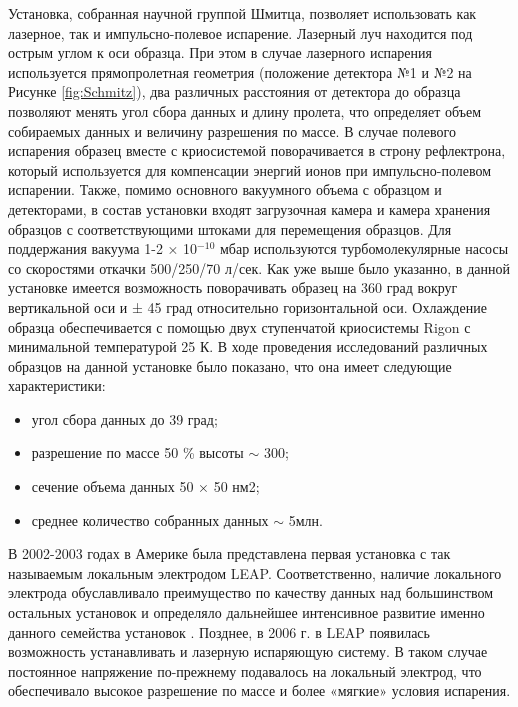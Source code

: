 Установка, собранная научной группой Шмитца, позволяет использовать как лазерное, так и импульсно-полевое испарение. Лазерный луч находится под острым углом к оси образца. При этом в случае лазерного испарения используется прямопролетная геометрия (положение детектора №1 и №2 на Рисунке \cref{fig:Schmitz}), два различных расстояния от детектора до образца позволяют менять угол сбора данных и длину пролета, что определяет объем собираемых данных и величину разрешения по массе. В случае полевого испарения образец вместе с криосистемой поворачивается в строну рефлектрона, который используется для компенсации энергий ионов при импульсно-полевом испарении. Также, помимо основного вакуумного объема с образцом и детекторами, в состав установки входят загрузочная камера и камера хранения образцов с соответствующими штоками для перемещения образцов. Для поддержания вакуума 1-2 × 10$^{-10}$ мбар используются турбомолекулярные насосы со скоростями откачки 500/250/70 л/сек. Как уже выше было указанно, в данной установке имеется возможность поворачивать образец на 360 град вокруг вертикальной оси и ± 45 град относительно горизонтальной оси. Охлаждение образца обеспечивается с помощью двух ступенчатой криосистемы Rigon с минимальной температурой 25 К. В ходе проведения исследований различных образцов на данной установке было показано, что она имеет следующие характеристики:
\begin{itemize}[beginpenalty=10000] %
	\item угол сбора данных до 39 град;
	\item разрешение по массе 50 \% высоты $\sim$ 300;
	\item сечение объема данных 50 × 50 нм2;
	\item среднее количество собранных данных $\sim$ 5млн.
\end{itemize}	

В 2002-2003 годах в Америке была представлена первая установка с так называемым локальным электродом LEAP.  Соответственно, наличие локального электрода обуславливало преимущество по качеству данных над большинством остальных установок и определяло дальнейшее интенсивное развитие именно данного семейства установок \cite{Kelly00}. Позднее, в 2006 г. в LEAP появилась возможность устанавливать и лазерную испаряющую систему. В таком случае постоянное напряжение по-прежнему подавалось на локальный электрод, что обеспечивало высокое разрешение по массе и более «мягкие» условия испарения.

